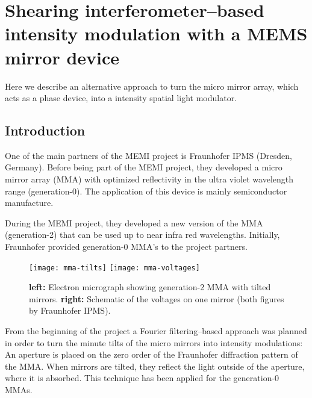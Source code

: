\chapter{Shearing interferometer--based intensity modulation with a
  MEMS mirror device}
\lstset{language=Maxima}
\begin{summary}
  Here we describe an alternative approach to turn the micro mirror
  array, which acts as a phase device, into a intensity spatial light
  modulator. 
\end{summary}
\section{Introduction}
One of the main partners of the MEMI project is Fraunhofer IPMS
(Dresden, Germany). Before being part of the MEMI project, they
developed a micro mirror array (MMA) with optimized reflectivity in
the ultra violet wavelength range (generation-0). The application of
this device is mainly semiconductor manufacture.

During the MEMI project, they developed a new version of the MMA
(generation-2) that can be used up to near infra red
wavelengths. Initially, Fraunhofer provided generation-0 MMA's to the
project partners.
\begin{figure}[htbp]
  \centering
  \texttt{[image: mma-tilts]}
  \texttt{[image: mma-voltages]}
  \caption{{\bf left:} Electron micrograph showing generation-2 MMA
    with tilted mirrors. {\bf right:} Schematic of the voltages on one
    mirror (both figures by Fraunhofer IPMS).}
  \label{fig:mma-tilts}
\end{figure}
From the beginning of the project a Fourier filtering--based approach
was planned in order to turn the minute tilts of the micro mirrors
into intensity modulations: An aperture is placed on the zero order of
the Fraunhofer diffraction pattern of the MMA. When mirrors are
tilted, they reflect the light outside of the aperture, where it is
absorbed.  This technique has been applied for the generation-0
MMAs. 

